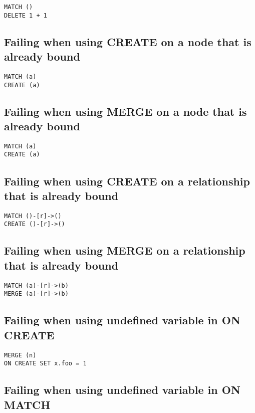 \begin{lstlisting}
MATCH ()
DELETE 1 + 1
\end{lstlisting}

\subsection{Failing when using CREATE on a node that is already bound}

\begin{lstlisting}
MATCH (a)
CREATE (a)
\end{lstlisting}

\subsection{Failing when using MERGE on a node that is already bound}

\begin{lstlisting}
MATCH (a)
CREATE (a)
\end{lstlisting}

\subsection{Failing when using CREATE on a relationship that is already bound}

\begin{lstlisting}
MATCH ()-[r]->()
CREATE ()-[r]->()
\end{lstlisting}

\subsection{Failing when using MERGE on a relationship that is already bound}

\begin{lstlisting}
MATCH (a)-[r]->(b)
MERGE (a)-[r]->(b)
\end{lstlisting}

\subsection{Failing when using undefined variable in ON CREATE}

\begin{lstlisting}
MERGE (n)
ON CREATE SET x.foo = 1
\end{lstlisting}

\subsection{Failing when using undefined variable in ON MATCH}

